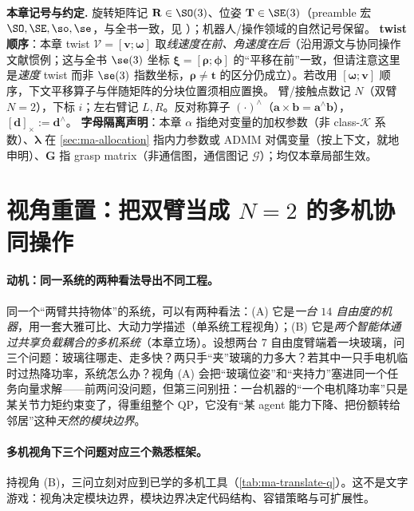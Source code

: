 \begin{note}
\textbf{本章记号与约定.}\;
旋转矩阵记 $\mathbf{R}\in\SO(3)$、位姿 $\mathbf{T}\in\SE(3)$（preamble 宏 $\SO,\SE,\so,\se$，与全书一致，见 ）；机器人/操作领域的自然记号保留。
\textbf{twist 顺序}：本章 twist $\boldsymbol{\mathcal{V}}=[\mathbf{v};\boldsymbol{\omega}]$ 取\emph{线速度在前、角速度在后}（沿用源文与协同操作文献惯例；这与全书 $\se(3)$ 坐标 $\boldsymbol{\xi}=[\boldsymbol{\rho};\boldsymbol{\phi}]$ 的“平移在前”一致，但请注意这里是\emph{速度} twist 而非 $\se(3)$ 指数坐标，$\boldsymbol{\rho}\neq\mathbf{t}$ 的区分仍成立）。若改用 $[\boldsymbol{\omega};\mathbf{v}]$ 顺序，下文平移算子与伴随矩阵的分块位置须相应置换。
臂/接触点数记 $N$（双臂 $N=2$），下标 $i$；左右臂记 $L,R$。反对称算子 $(\cdot)^\wedge$（$\mathbf{a}\times\mathbf{b}=\mathbf{a}^\wedge\mathbf{b}$），$[\mathbf{d}]_\times:=\mathbf{d}^\wedge$。
\textbf{字母隔离声明}：本章 $\alpha$ 指绝对变量的加权参数（非 class-$\mathcal{K}$ 系数）、$\boldsymbol{\lambda}$ 在 \cref{sec:ma-allocation} 指内力参数或 ADMM 对偶变量（按上下文，就地申明）、$\mathbf{G}$ 指 grasp matrix（非通信图，通信图记 $\mathcal{G}$）；均仅本章局部生效。
\end{note}

\section{视角重置：把双臂当成 $N=2$ 的多机协同操作}
\label{sec:ma-perspective}

\paragraph{动机：同一系统的两种看法导出不同工程。}
同一个“两臂共持物体”的系统，可以有两种看法：(A) 它是\emph{一台 $14$ 自由度的机器}，用一套大雅可比、大动力学描述（单系统工程视角）；(B) 它是\emph{两个智能体通过共享负载耦合的多机系统}（本章立场）。设想两台 $7$ 自由度臂端着一块玻璃，问三个问题：玻璃往哪走、走多快？两只手“夹”玻璃的力多大？若其中一只手电机临时过热降功率，系统怎么办？视角 (A) 会把“玻璃位姿”和“夹持力”塞进同一个任务向量求解——前两问没问题，但第三问别扭：一台机器的“一个电机降功率”只是某关节力矩约束变了，得重组整个 QP，它没有“某 agent 能力下降、把份额转给邻居”这种\emph{天然的模块边界}。

\paragraph{多机视角下三个问题对应三个熟悉框架。}
持视角 (B)，三问立刻对应到已学的多机工具（\cref{tab:ma-translate-q}）。这不是文字游戏：视角决定模块边界，模块边界决定代码结构、容错策略与可扩展性。

